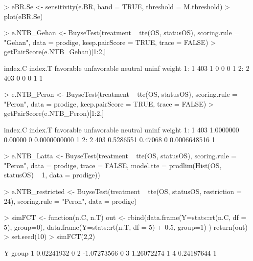 \documentclass[12pt]{article}
\theoremstyle{definition}
\begin{document}
\begin{Rcode}
> eBR.Se <- sensitivity(e.BR, band = TRUE,
                      threshold = M.threshold)
> plot(eBR.Se)
\end{Rcode}


\begin{Rcode}
> e.NTB_Gehan <- BuyseTest(treatment ~ tte(OS, statusOS), scoring.rule = "Gehan", 
                         data = prodige, keep.pairScore = TRUE, trace = FALSE)
> getPairScore(e.NTB_Gehan)[1:2,]
\end{Rcode}
\begin{Routput}
   index.C index.T favorable unfavorable neutral uninf weight
1:       1     403         1           0       0     0      1
2:       2     403         0           0       0     1      1
\end{Routput}

\begin{Rcode}
> e.NTB_Peron <- BuyseTest(treatment ~ tte(OS, statusOS), scoring.rule = "Peron", 
                         data = prodige, keep.pairScore = TRUE, trace = FALSE)
> getPairScore(e.NTB_Peron)[1:2,]
\end{Rcode}
\begin{Routput}
   index.C index.T favorable unfavorable neutral        uninf weight
1:       1     403 1.0000000     0.00000       0 0.0000000000      1
2:       2     403 0.5286551     0.47068       0 0.0006648516      1
\end{Routput}


\begin{Rcode}
> e.NTB_Latta <- BuyseTest(treatment ~ tte(OS, statusOS), scoring.rule = "Peron", 
                           data = prodige, trace = FALSE,
                           model.tte = prodlim(Hist(OS, statusOS) ~ 1, data = prodige))
\end{Rcode}



\begin{Rcode}
> e.NTB_restricted <- BuyseTest(treatment ~ tte(OS, statusOS, restriction = 24), 
                                scoring.rule = "Peron", data = prodige)
\end{Rcode}


\clearpage

\begin{Rcode}
> simFCT <- function(n.C, n.T){
   out <- rbind(data.frame(Y=stats::rt(n.C, df = 5), group=0),
                data.frame(Y=stats::rt(n.T, df = 5) + 0.5, group=1)
                )
   return(out)
}
> set.seed(10)
> simFCT(2,2)
\end{Rcode}
\begin{Routput}
            Y group
1  0.02241932     0
2 -1.07273566     0
3  1.26072274     1
4  0.24187644     1
\end{Routput}
\end{document}

